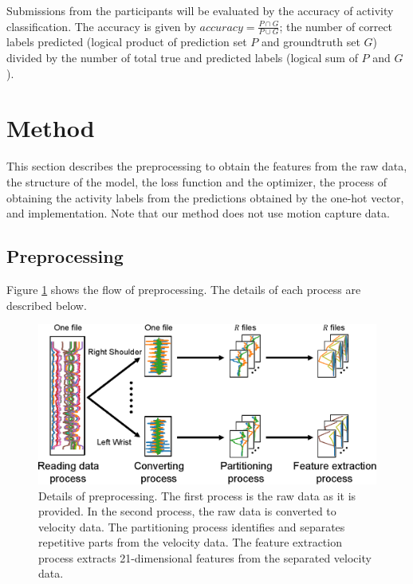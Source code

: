 \documentclass[graybox]{svmult}
\begin{document}
Submissions from the participants will be evaluated by the accuracy of activity classification. The accuracy is given by $accuracy = \frac{P\cap G}{P\cup G}$; the number of correct labels predicted (logical product of prediction set $P$ and groundtruth set $G$) divided by the number of total true and predicted labels (logical sum of $P$ and $G$).



\section{Method}
\label{sec:method}
This section describes the preprocessing to obtain the features from the raw data, the structure of the model, the loss function and the optimizer, the process of obtaining the activity labels from the predictions obtained by the one-hot vector, and implementation. Note that our method does not use motion capture data.


\subsection{Preprocessing}
\label{sec:preprocess}
Figure \ref{fig:preprocess} shows the flow of preprocessing. The details of each process are described below.

\begin{figure}[ht]
    \centering
    \includegraphics[width=0.8\linewidth]{figures/preprocess.eps}
    \caption{Details of preprocessing. The first process is the raw data as it is provided. In the second process, the raw data is converted to velocity data. The partitioning process identifies and separates repetitive parts from the velocity data. The feature extraction process extracts 21-dimensional features from the separated velocity data.}
    \label{fig:preprocess}
\end{figure}
\end{document}
